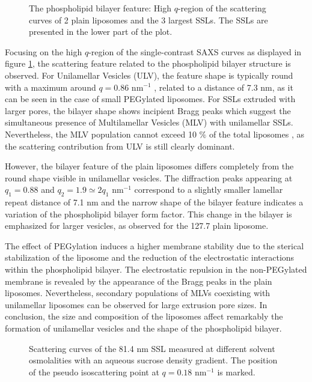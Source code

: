 \begin{figure}
	\centering
		
		\caption{The phospholipid bilayer feature: High $q$-region of the scattering curves of 2 plain liposomes and the 3 largest SSLs. The SSLs are presented in the lower part of the plot.}
		\label{fig:SSLSingleContrastBilayer}
\end{figure}

Focusing on the high $q$-region of the single-contrast SAXS curves as displayed in figure \ref{fig:SSLSingleContrastBilayer}, the scattering feature related to the phospholipid bilayer structure is observed. For Unilamellar Vesicles (ULV), the feature shape is typically round with a maximum around $q=0.86$ nm$^{-1}$ \cite{varga_characterization_2012}, related to a distance of 7.3 nm, as it can be seen in the case of small PEGylated liposomes. For SSLs extruded with larger pores, the bilayer shape shows incipient Bragg peaks which suggest the simultaneous presence of Multilamellar Vesicles (MLV) with unilamellar SSLs. Nevertheless, the MLV population cannot exceed 10 $\%$ of the total liposomes \cite{sakuragi_transformation_2011}, as the scattering contribution from ULV is still clearly dominant.

However, the bilayer feature of the plain liposomes differs completely from the round shape visible in unilamellar vesicles. The diffraction peaks appearing at $q_1=0.88$ and $q_2=1.9\simeq2q_1$ nm$^{-1}$ correspond to a slightly smaller lamellar repeat distance of 7.1 nm and the narrow shape of the bilayer feature indicates a variation of the phospholipid bilayer form factor. This change in the bilayer is emphasized for larger vesicles, as observed for the 127.7 plain liposome.

The effect of PEGylation induces a higher membrane stability due to the sterical stabilization of the liposome and the reduction of the electrostatic interactions within the phospholipid bilayer. The electrostatic repulsion in the non-PEGylated membrane is revealed by the appearance of the Bragg peaks in the plain liposomes. Nevertheless, secondary populations of MLVs coexisting with unilamellar liposomes can be observed for large extrusion pore sizes. In conclusion, the size and composition of the liposomes affect remarkably the formation of unilamellar vesicles and the shape of the phospholipid bilayer.

\begin{figure}
	\centering
		
		\caption{Scattering curves of the 81.4 nm SSL measured at different solvent osmolalities with an aqueous sucrose density gradient. The position of the pseudo isoscattering point at $q=0.18$ nm$^{-1}$ is marked.}
		\label{fig:SSLContinuousSAXS}
\end{figure}

